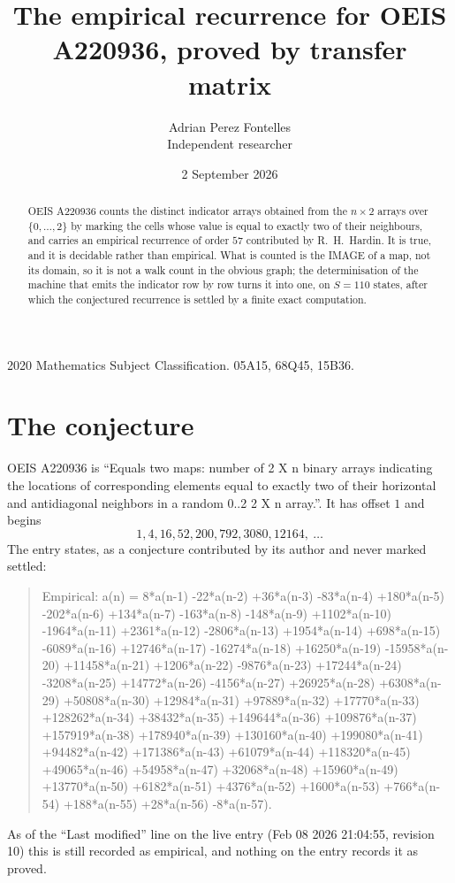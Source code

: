 \documentclass[11pt,a4paper]{article}
\title{The empirical recurrence for OEIS A220936, proved by transfer matrix}
\author{Adrian Perez Fontelles\\ \small Independent researcher}
\date{2 September 2026}
\theoremstyle{plain}
\theoremstyle{definition}
\begin{document}
\maketitle

\begin{abstract}
OEIS A220936 counts the distinct indicator arrays obtained from the $n\times2$ arrays over
$\{0,\dots,2\}$ by marking the cells whose value is equal to exactly two of their neighbours, and carries an
empirical recurrence of order $57$ contributed by R.~H.~Hardin. It is true, and it is
decidable rather than empirical. What is counted is the IMAGE of a map, not its domain, so it
is not a walk count in the obvious graph; the determinisation of the machine that emits the
indicator row by row turns it into one, on $S=110$ states, after which the conjectured
recurrence is settled by a finite exact computation.
\end{abstract}

\noindent\small 2020 Mathematics Subject Classification. 05A15, 68Q45, 15B36.\normalsize

\section{The conjecture}

OEIS A220936 is ``Equals two maps: number of 2 X n binary arrays indicating the locations of corresponding elements equal to exactly two of their horizontal and antidiagonal neighbors in a random 0..2 2 X n array.''. It has offset $1$ and begins
\[
1, 4, 16, 52, 200, 792, 3080, 12164,\ \dots
\]
The entry states, as a conjecture contributed by its author and never marked settled:
\begin{quote}
Empirical: a(n) = 8*a(n-1) -22*a(n-2) +36*a(n-3) -83*a(n-4) +180*a(n-5) -202*a(n-6) +134*a(n-7) -163*a(n-8) -148*a(n-9) +1102*a(n-10) -1964*a(n-11) +2361*a(n-12) -2806*a(n-13) +1954*a(n-14) +698*a(n-15) -6089*a(n-16) +12746*a(n-17) -16274*a(n-18) +16250*a(n-19) -15958*a(n-20) +11458*a(n-21) +1206*a(n-22) -9876*a(n-23) +17244*a(n-24) -3208*a(n-25) +14772*a(n-26) -4156*a(n-27) +26925*a(n-28) +6308*a(n-29) +50808*a(n-30) +12984*a(n-31) +97889*a(n-32) +17770*a(n-33) +128262*a(n-34) +38432*a(n-35) +149644*a(n-36) +109876*a(n-37) +157919*a(n-38) +178940*a(n-39) +130160*a(n-40) +199080*a(n-41) +94482*a(n-42) +171386*a(n-43) +61079*a(n-44) +118320*a(n-45) +49065*a(n-46) +54958*a(n-47) +32068*a(n-48) +15960*a(n-49) +13770*a(n-50) +6182*a(n-51) +4376*a(n-52) +1600*a(n-53) +766*a(n-54) +188*a(n-55) +28*a(n-56) -8*a(n-57).
\end{quote}
As of the ``Last modified'' line on the live entry (Feb 08 2026 21:04:55, revision 10) this is still
recorded as empirical, and nothing on the entry records it as proved.
\end{document}
